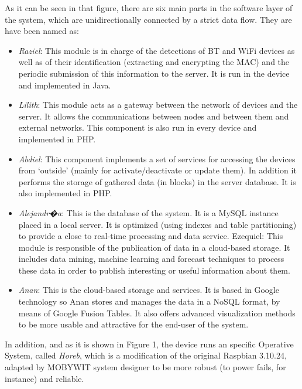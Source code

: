 \documentclass[preprint]{elsarticle}
\begin{document}
As it can be seen in that figure, there are six main parts in the software layer of the system, which are unidirectionally connected by a strict data flow. They are have been named as:
\begin{itemize}

\item \textit{Raziel}: This module is in charge of the detections of BT and WiFi devices as well as of their identification (extracting and encrypting the MAC) and the periodic submission of this information to the server. It is run in the device and implemented in Java.

\item \textit{Lilith}: This module acts as a gateway between the network of devices and the server. It allows the communications between nodes and between them and external networks. This component is also run in every device and implemented in PHP.

\item \textit{Abdiel}: This component implements a set of services for accessing the devices from `outside' (mainly for activate/deactivate or update them). In addition it performs the storage of gathered data (in blocks) in the server database. It is also implemented in PHP.

\item \textit{Alejandr�a}: This is the database of the system. It is a MySQL instance placed in a local server. It is optimized (using indexes and table partitioning) to provide a close to real-time processing and data service.
Ezequiel: This module is responsible of the publication of data in a cloud-based storage. It includes data mining, machine learning and forecast techniques to process these data in order to publish interesting or useful information about them.

\item \textit{Anan}: This is the cloud-based storage and services. It is based in Google technology so Anan stores and manages the data in a NoSQL format, by means of Google Fusion Tables. It also offers advanced visualization methods to be more usable and attractive for the end-user of the system.

\end{itemize}

In addition, and as it is shown in Figure 1, the device runs an specific Operative System, called \textit{Horeb}, which is a modification of the original Raspbian 3.10.24, adapted by MOBYWIT system designer to be more robust (to power fails, for instance) and reliable.
\end{document}
